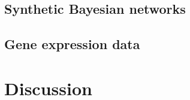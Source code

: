 \documentclass{article} %
\begin{document}
\subsection{Synthetic Bayesian networks}

\subsection{Gene expression data}

\section{Discussion}

\begin{small}

%
%

\end{small}

%
\end{document}
